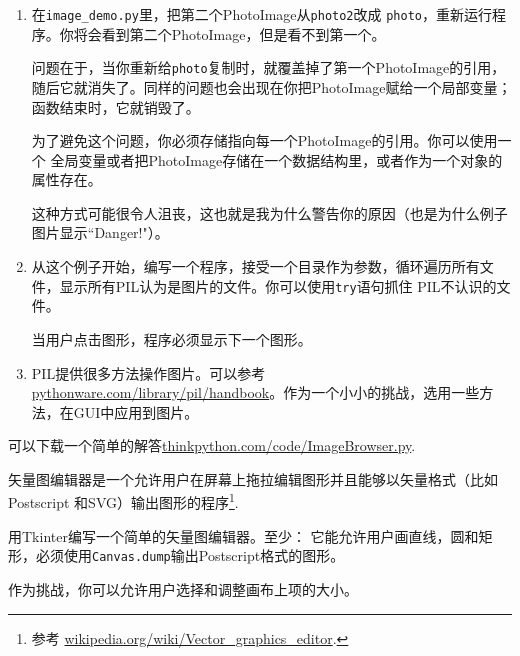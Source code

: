 \begin{ex}
\begin{enumerate}
\item 在\verb"image_demo.py"里，把第二个PhotoImage从{\tt photo2}改成
{\tt photo}，重新运行程序。你将会看到第二个PhotoImage，但是看不到第一个。

问题在于，当你重新给{\tt photo}复制时，就覆盖掉了第一个PhotoImage的引用，随后它就消失了。同样的问题也会出现在你把PhotoImage赋给一个局部变量；函数结束时，它就销毁了。

为了避免这个问题，你必须存储指向每一个PhotoImage的引用。你可以使用一个
全局变量或者把PhotoImage存储在一个数据结构里，或者作为一个对象的属性存在。

这种方式可能很令人沮丧，这也就是我为什么警告你的原因（也是为什么例子图片显示“Danger!"）。


\item 从这个例子开始，编写一个程序，接受一个目录作为参数，循环遍历所有文件，显示所有PIL认为是图片的文件。你可以使用{\tt try}语句抓住
PIL不认识的文件。

当用户点击图形，程序必须显示下一个图形。

\item PIL提供很多方法操作图片。可以参考 \url{pythonware.com/library/pil/handbook}。作为一个小小的挑战，选用一些方法，在GUI中应用到图片。

\end{enumerate}

可以下载一个简单的解答\url{thinkpython.com/code/ImageBrowser.py}.

\end{ex}

\begin{ex}


矢量图编辑器是一个允许用户在屏幕上拖拉编辑图形并且能够以矢量格式（比如Postscript 和SVG）输出图形的程序\footnote{参考
  \url{wikipedia.org/wiki/Vector_graphics_editor}.}.


用Tkinter编写一个简单的矢量图编辑器。至少：
它能允许用户画直线，圆和矩形，必须使用{\tt Canvas.dump}输出Postscript格式的图形。

作为挑战，你可以允许用户选择和调整画布上项的大小。
\end{ex}

